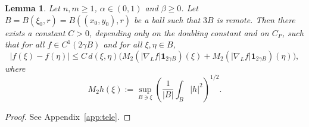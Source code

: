 \documentclass[12pt]{amsart}
\newtheorem{lemma}[theorem]{Lemma}
\begin{document}
\begin{lemma}\label{le_tele}
Let $n,m\ge 1$, $\alpha\in (0,1)$ and $\beta \ge 0$. Let $B=B(\xi_0,r) = B((x_0,y_0),r)$ be a ball such that $3B$ is remote. Then there exists a constant $C>0$, depending only on the doubling constant and on $C_P$, such that for all $f\in C^{1}(2\gamma B)$ and for all $\xi,\eta\in B$,
\begin{equation}\label{eq:remote-lemma-312}
|f(\xi)-f(\eta)|
\le
C\, d(\xi,\eta)\Big(M_2(|\nabla_L f|\mathbf{1}_{2\gamma B})(\xi)+M_2(|\nabla_L f|\mathbf{1}_{2\gamma B})(\eta)\Big),
\end{equation}
where
\[
M_2 h(\xi):=\sup_{B\ni \xi}\left(\frac{1}{|B|}\int_B |h|^2 \right)^{1/2}.
\]
\end{lemma}

\begin{proof}
See Appendix~\ref{app:tele}.
\end{proof}






\end{document}
